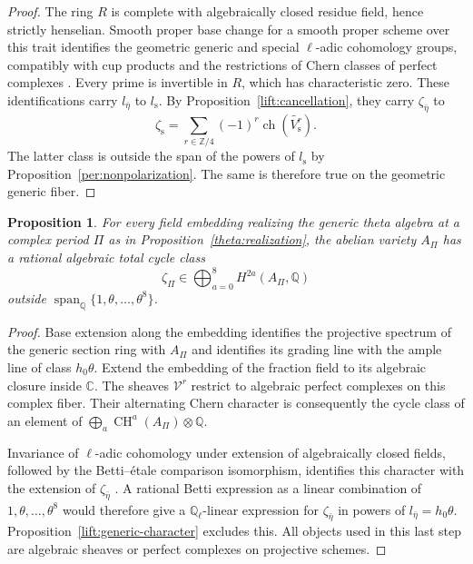 \documentclass[11pt]{article}
\newtheorem{proposition}[theorem]{Proposition}
\theoremstyle{definition}
\theoremstyle{remark}
\numberwithin{equation}{section}
\begin{document}
\begin{proof}
The ring $R$ is complete with algebraically closed residue field, hence
strictly henselian.  Smooth proper base change for a smooth proper scheme
over this trait identifies the geometric generic and special
$\ell$-adic cohomology groups, compatibly with cup products and the
restrictions of Chern classes of perfect complexes
\cite{smooth-proper}.  Every prime is invertible in $R$, which has
characteristic zero.  These identifications carry $l_{\bar\eta}$ to
$l_{\mathrm s}$.  By Proposition~\ref{lift:cancellation}, they carry
$\zeta_{\bar\eta}$ to
\[
 \zeta_{\mathrm s}
   =\sum_{r\in\mathbb Z/4}(-1)^r\operatorname{ch}(\widetilde{V_{\mathrm s}^r}).
\]
The latter class is outside the span of the powers of $l_{\mathrm s}$
by Proposition~\ref{per:nonpolarization}.  The same is therefore true
on the geometric generic fiber.
\end{proof}

\begin{proposition}
\label{lift:complex-class}
For every field embedding realizing the generic theta algebra at a
complex period $\Pi$ as in Proposition~\ref{theta:realization}, the abelian
variety $A_\Pi$ has a rational algebraic total cycle class
\[
 \zeta_\Pi\in\bigoplus_{a=0}^8H^{2a}(A_\Pi,\mathbb Q)
\]
outside $\operatorname{span}_\mathbb Q\{1,\theta,\ldots,\theta^8\}$.
\end{proposition}

\begin{proof}
Base extension along the embedding identifies the projective spectrum
of the generic section ring with $A_\Pi$ and identifies its grading line
with the ample line of class $h_0\theta$.  Extend the embedding of the
fraction field to its algebraic closure inside $\mathbb C$.  The sheaves
$\mathcal V^r$ restrict to algebraic perfect complexes on this complex
fiber.  Their alternating Chern character is consequently the cycle
class of an element of $\bigoplus_a\operatorname{CH}^a(A_\Pi)\otimes\mathbb Q$.

Invariance of $\ell$-adic cohomology under extension of algebraically
closed fields, followed by the Betti--\'etale comparison isomorphism,
identifies this character with the extension of $\zeta_{\bar\eta}$
\cite{smooth-proper}.  A rational Betti expression as a linear
combination of $1,\theta,\ldots,\theta^8$ would therefore give a
$\mathbb Q_\ell$-linear expression for $\zeta_{\bar\eta}$ in powers of
$l_{\bar\eta}=h_0\theta$.  Proposition~\ref{lift:generic-character}
excludes this.  All objects used in this last step are algebraic
sheaves or perfect complexes on projective schemes.
\end{proof}
\end{document}
